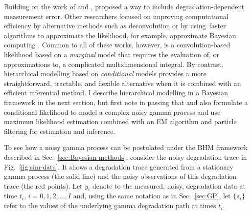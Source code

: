 Building on the work of \citet{kallen2005} and \citet{lu2013}, \citet{pulcini2016} proposed a way to include degradation-dependent measurement error. Other researchers focused on improving computational efficiency by alternative methods such as deconvolution \citep{rodriguez-picon2021} or by using faster algorithms to approximate the likelihood, for example, approximate Bayesian computing \citep{hazra2020, hazra2022}. Common to all of these works, however, is a convolution-based likelihood based on a \emph{marginal} model that requires the evaluation of, or approximations to, a complicated multidimensional integral. By contrast, hierarchical modelling based on \emph{conditional} models provides a more straightforward, tractable, and flexible alternative when it is combined with an efficient inferential method. I describe hierarchical modelling in a Bayesian framework in the next section, but first note in passing that \citet{giorgio2019} and \citet{esposito2022} also formulate a conditional likelihood to model a complex noisy gamma process and use maximum likelihood estimation combined with an EM algorithm and particle filtering for estimation and inference.

To see how a noisy gamma process can be postulated under the BHM framework described in Sec.~\ref{sec:Bayesian-methods}, consider the noisy degradation trace in Fig.~\ref{fig:sim-data}. It shows a degradation trace generated from a stationary gamma process (the solid line) and the noisy observations of this degradation trace (the red points). Let $y_i$ denote to the measured, noisy, degradation data at time $t_i$, $i = 0, 1, 2, \ldots, I$ and, using the same notation as in Sec.~\ref{sec:GP}, let $\{ z_i \}$ refer to the values of the underlying gamma degradation path at times $t_i$.

